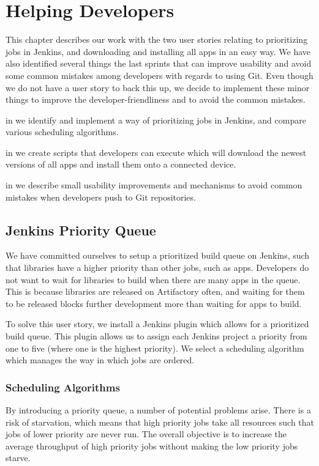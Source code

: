 \chapter{Helping Developers}
This chapter describes our work with the two user stories relating to prioritizing jobs in Jenkins, and downloading and installing all apps in an easy way. We have also identified several things the last sprints that can improve usability and avoid some common mistakes among developers with regards to using Git. Even though we do not have a user story to back this up, we decide to implement these minor things to improve the developer-friendliness and to avoid the common mistakes.

\begin{chapterorganization}
  \item in  we identify and implement a way of prioritizing jobs in Jenkins, and compare various scheduling algorithms.
  \item in  we create scripts that developers can execute which will download the newest versions of all apps and install them onto a connected device.
  \item in  we describe small usability improvements and mechanisms to avoid common mistakes when developers push to Git repositories.
\end{chapterorganization}

\section{Jenkins Priority Queue}\label{sec:jenkins_prio_queue}
We have committed ourselves to setup a prioritized build queue on Jenkins, such that libraries have a higher priority than other jobs, such as apps. Developers do not want to wait for libraries to build when there are many apps in the queue. This is because libraries are released on Artifactory often, and waiting for them to be released blocks further development more than waiting for apps to build.

To solve this user story, we install a Jenkins plugin \parencite{jenkins-priority-plugin} which allows for a prioritized build queue. This plugin allows us to assign each Jenkins project a priority from one to five (where one is the highest priority). We select a scheduling algorithm which manages the way in which jobs are ordered.

\subsection{Scheduling Algorithms}
By introducing a priority queue, a number of potential problems arise. There is a risk of starvation, which means that high priority jobs take all resources such that jobs of lower priority are never run. The overall objective is to increase the average throughput of high priority jobs without making the low priority jobs starve.

